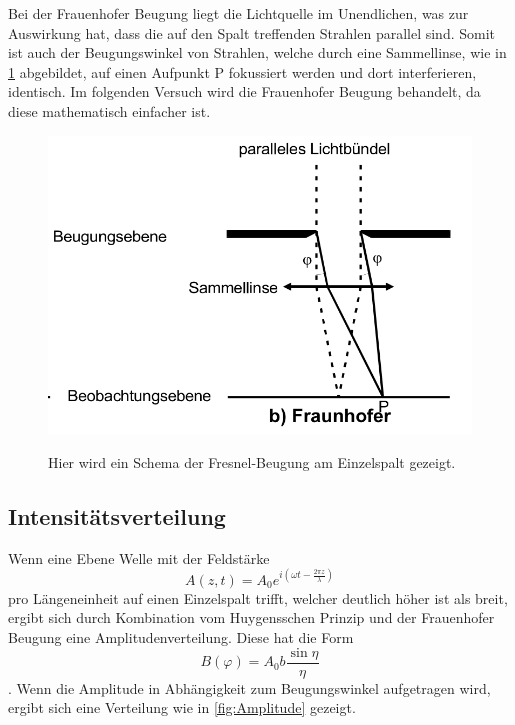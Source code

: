Bei der Frauenhofer Beugung liegt die Lichtquelle im Unendlichen, was zur Auswirkung hat, dass die auf den Spalt treffenden Strahlen parallel sind.
Somit ist auch der Beugungswinkel von Strahlen, welche durch eine Sammellinse, wie in \ref{fig:Frauenhofer} abgebildet, auf einen Aufpunkt P fokussiert werden und dort interferieren, identisch.
Im folgenden Versuch wird die Frauenhofer Beugung behandelt, da diese mathematisch einfacher ist.

\begin{figure}[H]
    \centering
    \caption{Hier wird ein Schema der Fresnel-Beugung am Einzelspalt gezeigt.}
    \includegraphics{Bilder/Frauenhofer.png}
    \label{fig:Frauenhofer}
\end{figure}

\subsection{Intensitätsverteilung}
Wenn eine Ebene Welle mit der Feldstärke
\begin{equation}
    A(z,t)=A_0 e^{i(\omega t - \frac{2 \pi z}{\lambda} )}
    \label{eqn:Feldstärke}
\end{equation}
pro Längeneinheit auf einen Einzelspalt trifft, welcher deutlich höher ist als breit, ergibt sich durch Kombination vom Huygensschen Prinzip und der Frauenhofer Beugung eine Amplitudenverteilung.
Diese hat die Form 
\begin{equation}
    B(\varphi)=A_0 b \frac{\sin \eta}{\eta}
    \label{eqn:Amplitude}
\end{equation}
 .
Wenn die Amplitude in Abhängigkeit zum Beugungswinkel aufgetragen wird, ergibt sich eine Verteilung wie in \ref{fig:Amplitude} gezeigt.


